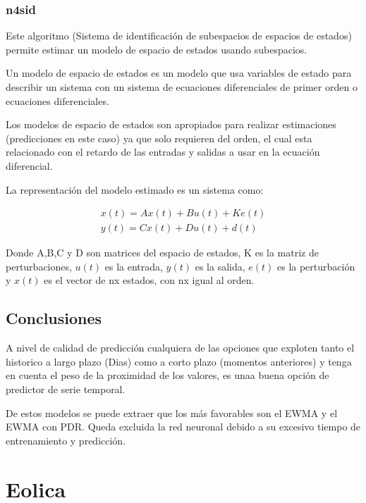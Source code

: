 \subsubsection{n4sid}
\label{ssub:n4sid}

Este algoritmo (Sistema de identificación de subespacios de espacios de estados) permite estimar un modelo de espacio de estados usando subespacios.

Un modelo de espacio de estados es un modelo que usa variables de estado para describir un sistema con un sistema de ecuaciones diferenciales de primer orden o ecuaciones diferenciales. 

Los modelos de espacio de estados son apropiados para realizar estimaciones (predicciones en este caso) ya que solo requieren del orden, el cual esta relacionado con el retardo de las entradas y salidas a usar en la ecuación diferencial.

La representación del modelo estimado es un sistema como:

\begin{align}
	x(t) = Ax(t) + Bu(t) + Ke(t) \\
	y(t) = Cx(t) + Du(t) + d(t)
\end{align}

Donde A,B,C y D son matrices del espacio de estados, K es la matriz de perturbaciones, $u(t)$ es la entrada, $y(t)$ es la salida, $e(t)$ es la perturbación y $x(t)$ es el vector de nx estados, con nx igual al orden.



\subsection{Conclusiones} 
\label{sub:conclusiones}

A nivel de calidad de predicción cualquiera de las opciones que exploten tanto el historico a largo plazo (Dias) como a corto plazo (momentos anteriores) y tenga en cuenta el peso de la proximidad de los valores, es unaa buena opción de predictor de serie temporal.

De estos modelos se puede extraer que los más favorables son el EWMA y el EWMA con PDR. Queda excluida la red neuronal debido a su excesivo tiempo de entrenamiento y predicción. 




\section{Eolica} 
\label{sec:eolica}

